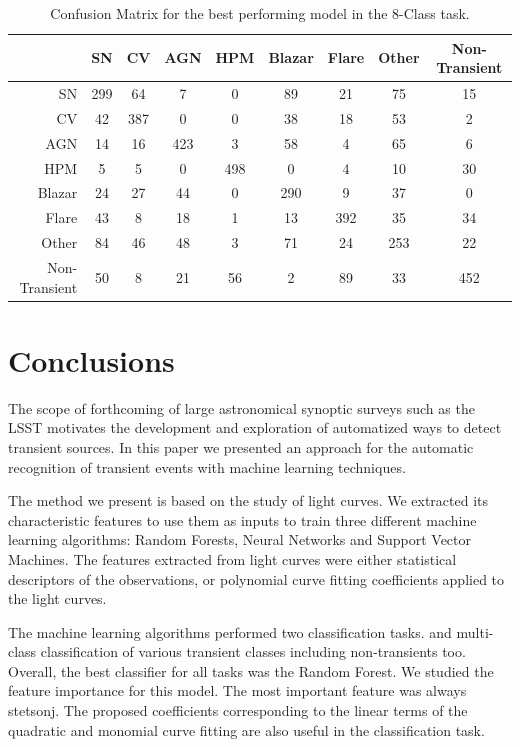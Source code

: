 \documentclass[a4paper,fleqn,usenatbib]{mnras}
\begin{document}
\begin{table}
\centering
\begin{tabular}{|r|c|c|c|c|c|c|c|c|}
\hline
\multicolumn{1}{|l|}{} & SN    & CV    & AGN   & HPM   & Blazar   & Flare   & Other   & Non-Transient  \\ \hline \hline
SN  & 299 & 64  & 7   & 0 & 89 & 21 & 75 & 15 \\ \hline
CV  & 42 & 387  & 0 & 0 & 38 & 18 & 53 & 2 \\ \hline
AGN  & 14 & 16 & 423  & 3 & 58 & 4 & 65 & 6 \\ \hline
HPM  & 5 & 5  & 0 & 498 & 0 & 4 & 10 & 30 \\ \hline
Blazar  & 24 & 27 & 44  & 0 & 290 & 9 & 37 & 0 \\ \hline
Flare  & 43 & 8 & 18  & 1 & 13 & 392 & 35 & 34 \\ \hline
Other  & 84 & 46 & 48  & 3 & 71 & 24 & 253 & 22 \\ \hline
Non-Transient  & 50  & 8 & 21 & 56 & 2 & 89 & 33 & 452 \\ \hline
\end{tabular}
\caption{Confusion Matrix for the best performing model in the 8-Class task.}
\label{Confusion-8-Class}
\end{table}



\section{Conclusions}

The scope of forthcoming of large astronomical synoptic surveys such
as the LSST \citep{0805.2366} motivates the development and
exploration of automatized ways to detect transient sources.
In this paper we presented an approach for the automatic recognition
of transient events with machine learning techniques.   

The method we present is based on the study of light curves. 
We extracted its characteristic features to use them as inputs
to train three different machine learning algorithms: Random Forests,
Neural Networks and Support Vector Machines.
The features extracted from light curves were either statistical
descriptors of the observations, or polynomial curve fitting
coefficients applied to the light curves.   

The machine learning algorithms performed two classification tasks.
and multi-class classification of various transient classes including
non-transients too. 
Overall, the best classifier for all tasks was the Random Forest.
We studied the feature importance for this model.
The most important feature was always stetson\textunderscore j.
The proposed coefficients corresponding to the linear terms of the
quadratic and monomial curve fitting are also useful in the
classification task.
\end{document}
